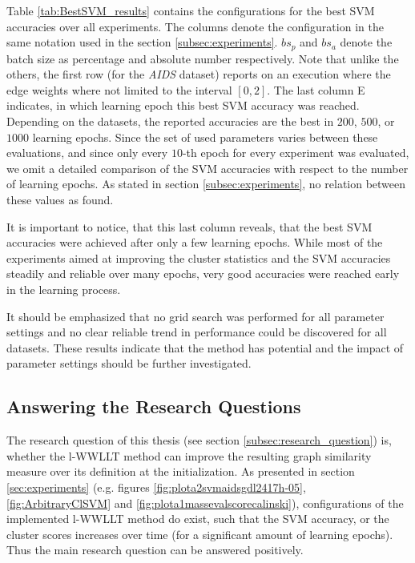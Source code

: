     	Table \ref{tab:BestSVM_results} contains the configurations for the best SVM accuracies over all experiments.
    	The columns denote the configuration in the same notation used in the section \ref{subsec:experiments}.
    	$bs_p$ and $bs_a$ denote the batch size as percentage and absolute number respectively.
    	Note that unlike the others, the first row (for the \textit{AIDS} dataset) reports on an execution where the edge weights where not limited to the interval $[0, 2]$.
    	The last column E indicates, in which learning epoch this best SVM accuracy was reached.
    	Depending on the datasets, the reported accuracies are the best in $200$, $500$, or $1000$ learning epochs.
    	Since the set of used parameters varies between these evaluations, and since only every $10$-th epoch for every experiment was evaluated, we omit a detailed comparison of the SVM accuracies with respect to the number of learning epochs.
    	As stated in section \ref{subsec:experiments}, no relation between these values as found.
    	
    	It is important to notice, that this last column reveals, that the best SVM accuracies were achieved after only a few learning epochs.
    	While most of the experiments aimed at improving the cluster statistics and the SVM accuracies steadily and reliable over many epochs, very good accuracies were reached early in the learning process.
    	
    	It should be emphasized that no grid search was performed for all parameter settings and no clear reliable trend in performance could be discovered for all datasets.    	
    	These results indicate that the method has potential and the impact of parameter settings should be further investigated.
    	
    \subsection{Answering the Research Questions} \label{subsec:research_answer}
    
	    The research question of this thesis (see section \ref{subsec:research_question}) is, whether the l-WWLLT method can improve the resulting graph similarity measure over its definition at the initialization.
	    As presented in section \ref{sec:experiments} (e.g. figures \ref{fig:plota2svmaidsgdl2417h-05}, \ref{fig:ArbitraryClSVM} and \ref{fig:plota1massevalscorecalinski}), configurations of the implemented l-WWLLT method do exist, such that the SVM accuracy, or the cluster scores increases over time (for a significant amount of learning epochs).
	    Thus the main research question can be answered positively.
	    

